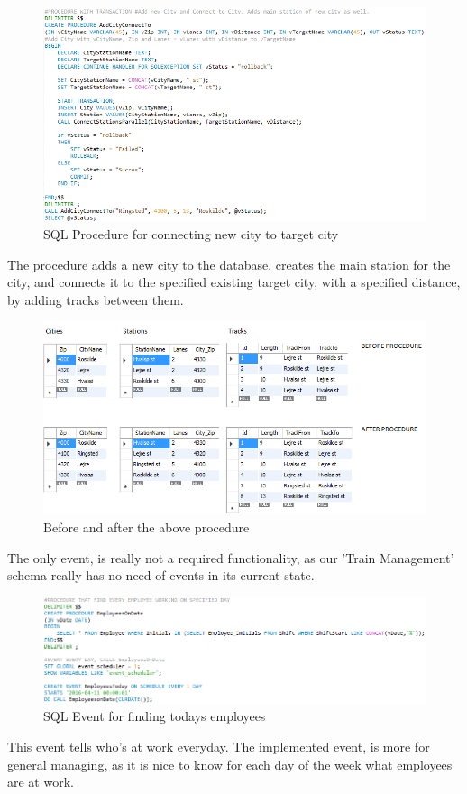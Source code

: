 \begin{figure}[ht!]
    \centering
    \includegraphics[width=1\textwidth]{img/SQL_PROCEDURE_AddCityConnect}
    \caption{SQL Procedure for connecting new city to target city}
    \label{fig:ER}
\end{figure}

The procedure adds a new city to the database, creates the main station for the city, and connects it to the specified existing target city, with a specified distance, by adding tracks between them.

\begin{figure}[ht!]
    \centering
    \includegraphics[width=1\textwidth]{img/SQL_PROCEDURE_AddCityConnect_example}
    \caption{Before and after the above procedure}
    \label{fig:ER}
\end{figure}
\newpage

The only event, is really not a required functionality, as our 'Train Management' schema really has no need of events in its current state. 

\begin{figure}[ht!]
    \centering
    \includegraphics[width=1\textwidth]{img/SQL_EVENT}
    \caption{SQL Event for finding todays employees}
    \label{fig:ER}
\end{figure}

This event tells who's at work everyday.
The implemented event, is more for general managing, as it is nice to know for each day of the week what employees are at work.